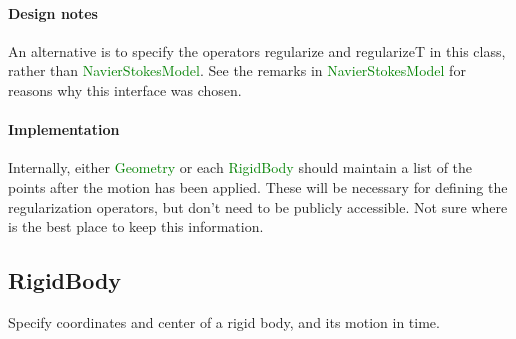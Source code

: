 \documentclass[11pt]{article}
\def\class#1{\textcolor{green}{\ttfamily\small #1}} %
\def\fn#1{{\ttfamily\small #1}} %
\begin{document}
\paragraph{Design notes}
An alternative is to specify the operators \fn{regularize} and \fn{regularizeT} in this class, rather than \class{NavierStokesModel}.  See the remarks in \class{NavierStokesModel} for reasons why this interface was chosen.

\paragraph{Implementation}
Internally, either \class{Geometry} or each \class{RigidBody} should maintain a list of the points after the motion has been applied.  These will be necessary for defining the regularization operators, but don't need to be publicly accessible.  Not sure where is the best place to keep this information.

\subsection{RigidBody}
Specify coordinates and center of a rigid body, and its motion in time.
\end{document}
